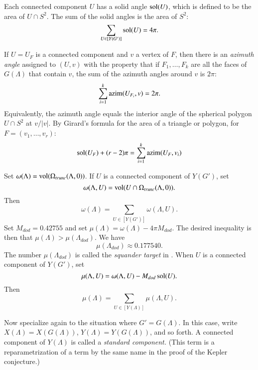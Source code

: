 \documentclass{article} %
\begin{document}
\begin{floatingfigure}{80mm}
  \begin{center}
   \end{center}
  \caption{}
\label{fig:counter}
\end{floatingfigure}


Each connected component $U$ has a solid angle $\operatorname{sol}(U)$, which
is defined to be the area of $U\cap S^2$.  The sum of the
solid angles is the area of $S^2$:
 $$
 \sum_{U\in[Y(G')]} \operatorname{sol}(U) = 4\pi.
 $$

If $U=U_F$ is a connected component and $v$ a vertex of $F$, then there
is an {\it azimuth angle} assigned to $(U,v)$ with the property
that if $F_1,\ldots,F_k$ are all the faces of $G(\Lambda)$
that contain $v$, the sum of the azimuth angles around
$v$ is $2\pi$:
  $$
  \sum_{i=1}^k {\operatorname{azim}}(U_{F_i},v) = 2\pi.
  $$
Equivalently, 
the azimuth angle equals the interior angle of the spherical
polygon $U\cap S^2$ at $v/|v|$.  By Girard's formula for
the area of a triangle or polygon,  for
$F = (v_1,\ldots,v_r)$:
  $$
  \operatorname{sol}(U_F) + (r-2)\pi = \sum_{i=1}^k {\operatorname{azim}}(U_F,v_i)
  $$

Set $\omega(\Lambda)={\operatorname{vol}}(\Omega_{trunc}(\Lambda,0))$.
If $U$ is a connected component of $Y(G')$, set
  $$\omega(\Lambda,U) = {\operatorname{vol}}(U\cap \Omega_{trunc}(\Lambda,0)).$$
Then
  \begin{equation}\label{eqn:omegaU}
  \omega(\Lambda) = 
  \sum_{U\in[Y(G')]} \omega(\Lambda,U).
  \end{equation}
Set $M_{dod}=0.42755$ and set  $\mu(\Lambda)= \omega(\Lambda)- 4\pi M_{dod}$.
The desired inequality is then
that $\mu(\Lambda) > \mu(\Lambda_{dod})$.  
We have 
$$
  \mu(\Lambda_{dod}) \approx 0.177540.
$$
The number $\mu(\Lambda_{dod})$ is called the {\it squander target} in \cite{arx}.  
When $U$ is a connected component of $Y(G')$, set
 \begin{equation}\label{eqn:mU}
  \mu(\Lambda,U)= \omega(\Lambda,U) - M_{dod} \operatorname{sol}(U).
  \end{equation}
Then
$$
\mu(\Lambda) = \sum_{U\in[Y(\Lambda)]} \mu(\Lambda,U).
$$




Now specialize again to the situation where $G'=G(\Lambda)$.
In this case, write $X(\Lambda)=X(G(\Lambda))$, $Y(\Lambda)=Y(G(\Lambda))$,
and so forth.
A connected component of $Y(\Lambda)$
is called a {\it standard component.}  (This term is a
reparametrization of a term by the same name
in the proof of the Kepler conjecture.)
\end{document}
